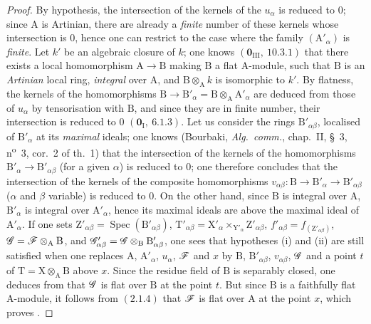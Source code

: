 \begin{proof}
By hypothesis, the intersection of the kernels of the $u_\alpha$ is reduced to $0$; since $\mathrm{A}$ is Artinian,
there are already a \emph{finite} number of these kernels whose intersection is $0$, hence one can
restrict to the case where the family $(\mathrm{A}'_\alpha)$ is \emph{finite}. Let $k'$ be an algebraic closure of $k$; one knows
$(\mathbf{0}_{\mathrm{III}},~10.3.1)$ that there exists a local homomorphism $\mathrm{A}\to\mathrm{B}$ making $\mathrm{B}$ a flat $\mathrm{A}$-module,
such that $\mathrm{B}$ is an \emph{Artinian} local ring, \emph{integral} over $\mathrm{A}$, and $\mathrm{B}\otimes_\mathrm{A} k$ is isomorphic to $k'$.
By flatness, the kernels of the homomorphisms $\mathrm{B}\to\mathrm{B}'_\alpha=\mathrm{B}\otimes_\mathrm{A}\mathrm{A}'_\alpha$ are deduced from those of
$u_\alpha$ by tensorisation with $\mathrm{B}$, and since they are in finite number, their intersection is
reduced to $0$ $(\mathbf{0}_\mathrm{I},~6.1.3)$. Let us consider the rings $\mathrm{B}'_{\alpha\beta}$, localised of $\mathrm{B}'_\alpha$ at its \emph{maximal} ideals;
one knows (Bourbaki, \emph{Alg.\ comm.}, chap.~II, \S~3, n\textsuperscript{o}~3, cor.~2 of th.~1) that the intersection
of the kernels of the homomorphisms $\mathrm{B}'_\alpha\to\mathrm{B}'_{\alpha\beta}$ (for a given $\alpha$) is reduced to $0$; one therefore concludes
that the intersection of the kernels of the composite homomorphisms $v_{\alpha\beta}:\mathrm{B}\to\mathrm{B}'_\alpha\to\mathrm{B}'_{\alpha\beta}$ ($\alpha$ and
$\beta$ variable) is reduced to $0$. On the other hand, since $\mathrm{B}$ is integral over $\mathrm{A}$, $\mathrm{B}'_\alpha$ is integral over $\mathrm{A}'_\alpha$,
hence its maximal ideals are above the maximal ideal of $\mathrm{A}'_\alpha$. If one sets
$\mathrm{Z}'_{\alpha\beta}=\operatorname{Spec}(\mathrm{B}'_{\alpha\beta})$,
$\mathrm{T}'_{\alpha\beta}=\mathrm{X}'_\alpha\times_{\mathrm{Y}'_\alpha}\mathrm{Z}'_{\alpha\beta}$,
$f'_{\alpha\beta}=f_{(\mathrm{Z}'_{\alpha\beta})}$,
$\mathscr{G}=\mathscr{F}\otimes_\mathrm{A}\mathrm{B}$, and
$\mathscr{G}'_{\alpha\beta}=\mathscr{G}\otimes_\mathrm{B}\mathrm{B}'_{\alpha\beta}$, one sees
that hypotheses (i) and (ii) are still satisfied when one replaces
$\mathrm{A}$, $\mathrm{A}'_\alpha$, $u_\alpha$, $\mathscr{F}$ and $x$ by $\mathrm{B}$, $\mathrm{B}'_{\alpha\beta}$, $v_{\alpha\beta}$, $\mathscr{G}$ and a point $t$ of $\mathrm{T}=\mathrm{X}\otimes_\mathrm{A}\mathrm{B}$ above $x$.
Since the residue field of $\mathrm{B}$ is separably closed, one deduces from  that
$\mathscr{G}$ is flat over $\mathrm{B}$ at the point $t$. But since $\mathrm{B}$ is a faithfully flat $\mathrm{A}$-module, it follows from $(2.1.4)$
that $\mathscr{F}$ is flat over $\mathrm{A}$ at the point $x$, which proves .
\end{proof}

